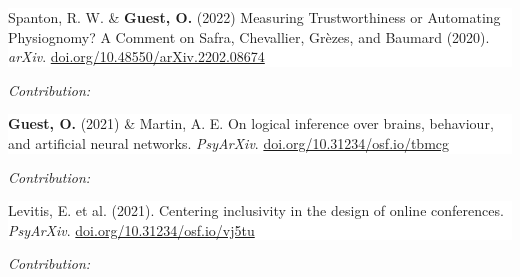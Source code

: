 \documentclass[10pt]{article}
\newcommand{\paper}[2]{\colorbox{white}{\begin{minipage}{\dimexpr\linewidth-2\fboxsep}#1
\end{minipage}}
\if\relax\detokenize{#2}\relax
    \vspace{2pt}
    \else
    \begin{flushright}
    \begin{minipage}{0.99\dimexpr\linewidth-2\fboxsep}\small
    \emph{Contribution:} #2
    \end{minipage}
    \end{flushright}
\fi
}
\begin{document}
\paper{Spanton, R. W. \& \textbf{Guest, O.} (2022) Measuring Trustworthiness or Automating Physiognomy? A Comment on Safra, Chevallier, Grèzes, and Baumard (2020). \textit{arXiv}. \newline
\href{https://doi.org/10.48550/arXiv.2202.08674}{doi.org/10.48550/arXiv.2202.08674}}{}

\paper{ \textbf{Guest, O.} (2021) \& Martin, A. E. On logical inference over brains, behaviour, and artificial neural networks. \textit{PsyArXiv}. \newline
\href{https://doi.org/10.31234/osf.io/tbmcg}{doi.org/10.31234/osf.io/tbmcg}}{}

\paper{Levitis, E. et al. (2021). Centering inclusivity in the design of online conferences. \textit{PsyArXiv}. \newline
\href{https://doi.org/10.31234/osf.io/vj5tu}{doi.org/10.31234/osf.io/vj5tu}}{}
 

\end{document}
